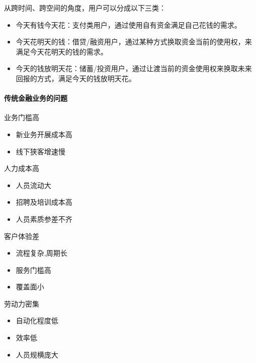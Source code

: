 \documentclass[letterpaper,10pt,english]{sphinxmanual}
\begin{document}
从跨时间、跨空间的角度，用户可以分成以下三类：
\begin{itemize}
\item {} 
今天有钱今天花：支付类用户，通过使用自有资金满足自己花钱的需求。

\item {} 
今天花明天的钱：借贷/融资用户，通过某种方式换取资金当前的使用权，来满足今天花明天的钱的需求。

\item {} 
今天的钱放明天花：储蓄/投资用户，通过让渡当前的资金使用权来换取未来回报的方式，满足今天的钱放明天花。%
\begin{footnote}[1089]\sphinxAtStartFootnote
{}
%
\end{footnote}

\end{itemize}


\paragraph{传统金融业务的问题}
\label{\detokenize{chapter_AI+Finance/Finance:id6}}
业务门槛高
\begin{itemize}
\item {} 
新业务开展成本高

\item {} 
线下狭客增速慢

\end{itemize}

人力成本高
\begin{itemize}
\item {} 
人员流动大

\item {} 
招聘及培训成本高

\item {} 
人员素质参差不齐

\end{itemize}

客户体验差
\begin{itemize}
\item {} 
流程复杂,周期长

\item {} 
服务门槛高

\item {} 
覆盖面小

\end{itemize}

劳动力密集 %
\begin{footnote}[1090]\sphinxAtStartFootnote
{}
%
\end{footnote}
\begin{itemize}
\item {} 
自动化程度低

\item {} 
效率低

\item {} 
人员规横庞大

\end{itemize}
\end{document}

